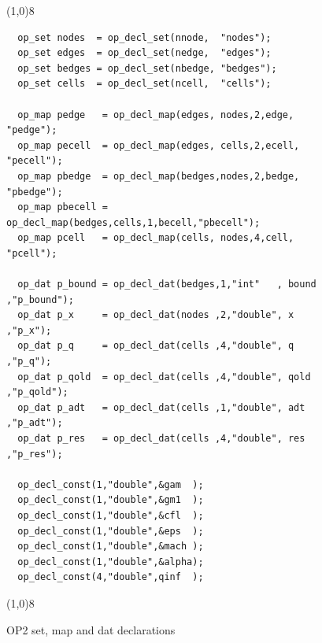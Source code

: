 \documentclass[11pt]{article}
\begin{document}
\begin{figure}[!h]\small
\vspace{-0pt}\noindent\line(1,0){8}\vspace{-10pt}
\begin{lstlisting}
  op_set nodes  = op_decl_set(nnode,  "nodes");
  op_set edges  = op_decl_set(nedge,  "edges");
  op_set bedges = op_decl_set(nbedge, "bedges");
  op_set cells  = op_decl_set(ncell,  "cells");

  op_map pedge   = op_decl_map(edges, nodes,2,edge,  "pedge");
  op_map pecell  = op_decl_map(edges, cells,2,ecell, "pecell");
  op_map pbedge  = op_decl_map(bedges,nodes,2,bedge, "pbedge");
  op_map pbecell = op_decl_map(bedges,cells,1,becell,"pbecell");
  op_map pcell   = op_decl_map(cells, nodes,4,cell,  "pcell");

  op_dat p_bound = op_decl_dat(bedges,1,"int"   , bound ,"p_bound");
  op_dat p_x     = op_decl_dat(nodes ,2,"double", x     ,"p_x");
  op_dat p_q     = op_decl_dat(cells ,4,"double", q     ,"p_q");
  op_dat p_qold  = op_decl_dat(cells ,4,"double", qold  ,"p_qold");
  op_dat p_adt   = op_decl_dat(cells ,1,"double", adt   ,"p_adt");
  op_dat p_res   = op_decl_dat(cells ,4,"double", res   ,"p_res");

  op_decl_const(1,"double",&gam  );
  op_decl_const(1,"double",&gm1  );
  op_decl_const(1,"double",&cfl  );
  op_decl_const(1,"double",&eps  );
  op_decl_const(1,"double",&mach );
  op_decl_const(1,"double",&alpha);
  op_decl_const(4,"double",qinf  );
\end{lstlisting}\vspace{-10pt}
\vspace{-0pt}\noindent\line(1,0){8}\vspace{-10pt}
\caption{\small OP2 set, map and dat declarations }
\normalsize\vspace{-10pt}\label{fig:decls}
\end{figure}
\end{document}
